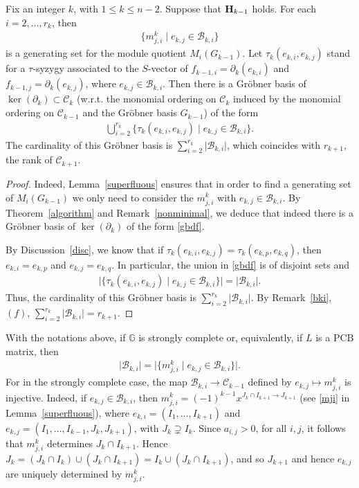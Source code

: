 \documentclass[ALCO]{cedram}
\newcommand{\mbg}{\mbox{$\mathbb{G}$}}
\newcommand{\mcb}{\mbox{$\mathcal{B}$}}
\newcommand{\mcc}{\mbox{$\mathcal{C}$}}
\newcommand{\pcb}{\mbox{$\mathrm{PCB}$}}
\newcommand{\mbfh}{\mbox{${\bf H}$}}
\newcommand{\dif}{\mbox{$\partial$}}
\begin{document}
\begin{proposition}\label{gbdesiredform}
Fix an integer $k$, with $1\leq k\leq n-2$. Suppose that $\mbfh_{k-1}$
holds. For each $i=2,\ldots ,r_k$, then
\begin{eqnarray*}
\{ m^k_{j,i}\mid e_{k,j}\in\mcb_{k,i}\}
\end{eqnarray*}
is a generating set for the module quotient $M_i(G_{k-1})$. Let
$\tau_k(e_{k,i},e_{k,j})$ stand for a $\tau$-syzygy associated to the
$S$-vector of $f_{k-1,i}=\dif_k(e_{k,i})$ and
$f_{k-1,j}=\dif_k(e_{k,j})$, where $e_{k,j}\in\mcb_{k,i}$. Then there
is a Gr\"obner basis of $\ker(\dif_k)\subset\mcc_k$ (w.r.t. the
monomial ordering on $\mcc_k$ induced by the monomial ordering on
$\mcc_{k-1}$ and the Gr\"obner basis $G_{k-1}$) of the form
\begin{eqnarray}\label{gbdf}
\bigcup_{i=2}^{r_k}\{\tau_{k}(e_{k,i},e_{k,j})\mid
e_{k,j}\in\mcb_{k,i}\}.
\end{eqnarray}
The cardinality of this Gr\"obner basis is
$\sum_{i=2}^{r_k}\lvert\mcb_{k,i}\rvert$, which coincides with
$r_{k+1}$, the rank of $\mcc_{k+1}$.
\end{proposition}
\begin{proof}
Indeed, Lemma~\ref{superfluous} ensures that in order to find a
generating set of $M_i(G_{k-1})$ we only need to consider the
$m^{k}_{j,i}$ with $e_{k,j}\in\mcb_{k,i}$. By Theorem~\ref{algorithm}
and Remark~\ref{nonminimal}, we deduce that indeed there is a Gr\"obner
basis of $\ker(\dif_k)$ of the form \eqref{gbdf}.

By Discussion~\ref{disc}, we know that if
$\tau_{k}(e_{k,i},e_{k,j})=\tau_k(e_{k,p},e_{k,q})$, then
$e_{k,i}=e_{k,p}$ and $e_{k,j}=e_{k,q}$. In particular, the union in
\eqref{gbdf} is of disjoint sets and
\begin{eqnarray*}
\lvert\{\tau_k(e_{k,i},e_{k,j})\mid
e_{k,j}\in\mcb_{k,i}\}\rvert=\lvert\mcb_{k,i}\rvert. 
\end{eqnarray*}
Thus, the cardinality of this Gr\"obner basis is
$\sum_{i=2}^{r_k}\lvert\mcb_{k,i}\rvert$. By Remark~\ref{bki}, $(f)$,
$\sum_{i=2}^{r_k}\lvert\mcb_{k,i}\rvert=r_{k+1}$.
\end{proof}

\begin{remark}\label{min-m}
With the notations above, if $\mbg$ is strongly complete or,
equivalently, if $L$ is a $\pcb$ matrix, then
\begin{eqnarray*}
\vert\mcb_{k,i}\rvert=
\lvert \{ m^k_{j,i}\mid e_{k,j}\in\mcb_{k,i}\}\rvert.
\end{eqnarray*}
For in the strongly complete case, the map $\mcb_{k,i}\to\mcc_{k-1}$
defined by $e_{k,j}\mapsto m^{k}_{j,i}$ is injective. Indeed, if
$e_{k,j}\in\mcb_{k,i}$, then $m^k_{j,i}=(-1)^{k-1}x^{J_{k}\cap
  I_{k+1}\to J_{k+1}}$ (see \eqref{mji} in Lemma~\ref{superfluous}),
where $e_{k,i}=(I_1,\ldots ,I_{k+1})$ and $e_{k,j}=(I_1,\ldots,
I_{k-1},J_k,J_{k+1})$, with $J_k\supsetneq I_k$. Since $a_{i,j}>0$,
for all $i,j$, it follows that $m^k_{j,i}$ determines $J_k\cap
I_{k+1}$. Hence $J_k=(J_k\cap I_k)\cup (J_k\cap I_{k+1})=I_k\cup
(J_k\cap I_{k+1})$, and so $J_{k+1}$ and hence $e_{k,j}$ are uniquely
determined by $m^k_{j,i}$.
\end{remark}
\end{document}

